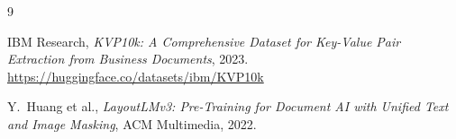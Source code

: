 \documentclass[11pt,a4paper]{article}
\begin{document}

\begin{thebibliography}{9}

IBM Research,
\textit{KVP10k: A Comprehensive Dataset for Key-Value Pair Extraction
from Business Documents}, 2023.\\
\url{https://huggingface.co/datasets/ibm/KVP10k}

Y.~Huang et al.,
\textit{LayoutLMv3: Pre-Training for Document AI with Unified Text and
Image Masking},
ACM Multimedia, 2022.

\end{thebibliography}
\end{document}
